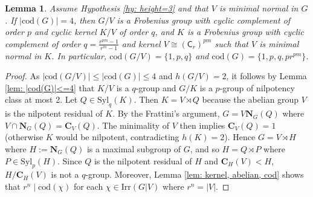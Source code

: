 \documentclass[9pt]{article}
\newtheorem{lem}{\bf Lemma}[section]
\begin{document}
\begin{lem}\label{lem: height=3 cod=4 V minimal}
	Assume Hypothesis \ref{hy: height=3} and that $V$ is minimal normal in $G$.
	If $|\mathrm{cod}(G)|=4$,
    then $G/V$ is a Frobenius group with cyclic complement of order $p$ and cyclic kernel $K/V$ of order $q$, and $K$ is a Frobenius group with cyclic complement of order $q=\frac{r^{pm}-1}{r^{m}-1}$ and kernel $V\cong (\mathsf{C}_{r})^{pm}$ such that $V$ is minimal normal in $K$. 
	In particular, $\mathrm{cod}(G/V)=\{1,p,q \}$ and $\mathrm{cod}(G)=\{ 1,p,q,pr^{pm} \}$.
\end{lem}
\begin{proof}
	As $|\mathrm{cod}(G/V)|\leq |\mathrm{cod}(G)|\leq  4$ and $h(G/V)=2$,
	it follows by Lemma \ref{lem: |cod(G)|<=4} that $K/V$ is a $q$-group and $G/K$ is a $p$-group of nilpotency class at most 2.
	Let $Q\in \mathrm{Syl}_{q}(K)$.
    Then $K=V \rtimes Q$ because the abelian group $V$ is the nilpotent residual of $K$.	
	By the Frattini's argument, $G=V\mathbf{N}_{G}(Q)$ where $V\cap \mathbf{N}_{G}(Q)=\mathbf{C}_{V}(Q)$.
    The minimality of $V$ then implies $\mathbf{C}_{V}(Q)=1$ (otherwise $K$ would be nilpotent, contradicting $h(K)=2$).
    Hence $G=V \rtimes H$ where $H:=\mathbf{N}_{G}(Q)$ is a maximal subgroup of $G$,
	and so $H=Q \rtimes P$ where $P\in \mathrm{Syl}_{p}(H)$.
    Since $Q$ is the nilpotent residual of $H$ and $\mathbf{C}_{H}(V)<H$,
    $H/\mathbf{C}_{H}(V)$ is not a $q$-group.
	Moreover, Lemma \ref{lem: kernel, abelian, cod} shows that $r^{n}\mid \mathrm{cod}(\chi)$ for each $\chi\in \mathrm{Irr}(G|V)$ where $r^{n}=|V|$.
	





\end{proof}
\end{document}
